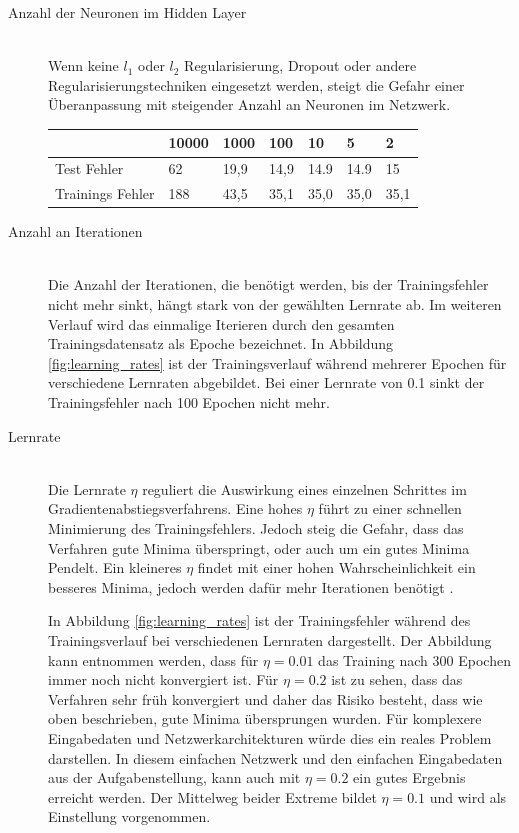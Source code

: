 \begin{description}
	\item[Anzahl der Neuronen im Hidden Layer]\hfill \\
	Wenn keine $l_1$ oder $l_2$ Regularisierung, Dropout \cite{dropout} oder andere Regularisierungstechniken eingesetzt werden, steigt die Gefahr einer Überanpassung mit steigender Anzahl an Neuronen im Netzwerk.   
	\begin{table}[ht]
		\centering
		\begin{tabular}{l|llllll}
			& 10000 & 1000 & 100  & 10   & 5    & 2    \\ \hline
			Test Fehler      & 62    & 19,9 & 14,9 & 14.9 & 14.9 & 15   \\
			Trainings Fehler & 188   & 43,5 & 35,1 & 35,0 & 35,0 & 35,1
		\end{tabular}
	\end{table}
	
	\item[Anzahl an Iterationen]\hfill \\
	Die Anzahl der Iterationen, die benötigt werden, bis der Trainingsfehler nicht mehr sinkt, hängt stark von der gewählten Lernrate ab. Im weiteren Verlauf wird das einmalige Iterieren durch den gesamten Trainingsdatensatz als Epoche bezeichnet. In Abbildung \ref*{fig:learning_rates} ist der Trainingsverlauf während mehrerer Epochen für verschiedene Lernraten abgebildet. Bei einer Lernrate von 0.1 sinkt der Trainingsfehler nach 100 Epochen nicht mehr.
	
	\item[Lernrate]\hfill \\
	Die Lernrate $\eta$ reguliert die Auswirkung eines einzelnen Schrittes im Gradientenabstiegsverfahrens. Eine hohes $\eta$ führt zu einer schnellen Minimierung des Trainingsfehlers. Jedoch steig die Gefahr, dass das Verfahren gute Minima überspringt, oder auch um ein gutes Minima Pendelt. Ein kleineres $\eta$ findet mit einer hohen Wahrscheinlichkeit ein besseres Minima, jedoch werden dafür mehr Iterationen benötigt \cite{neuronalenetze}.
	
	In Abbildung \ref*{fig:learning_rates} ist der Trainingsfehler während des Trainingsverlauf bei verschiedenen Lernraten dargestellt. Der Abbildung kann entnommen werden, dass für $\eta=0.01$ das Training nach 300 Epochen immer noch nicht konvergiert ist. Für $\eta=0.2$ ist zu sehen, dass das Verfahren sehr früh konvergiert und daher das Risiko besteht, dass wie oben beschrieben, gute Minima übersprungen wurden. Für komplexere Eingabedaten und Netzwerkarchitekturen würde dies ein reales Problem darstellen. In diesem einfachen Netzwerk und den einfachen Eingabedaten aus der Aufgabenstellung, kann auch mit $\eta=0.2$ ein gutes Ergebnis erreicht werden. Der Mittelweg beider Extreme bildet $\eta=0.1$ und wird als Einstellung vorgenommen.
	

\end{description}
